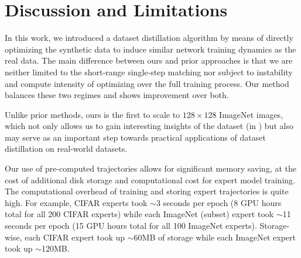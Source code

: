 \section{Discussion and Limitations}
In this work, we introduced a dataset distillation algorithm by means of directly optimizing the synthetic data to induce similar network training dynamics as the real data.  The main difference between ours and prior approaches is that we are neither limited to the short-range single-step matching nor subject to instability and compute intensity of optimizing over the full training process. Our method balances these two regimes and shows improvement over both. 

Unlike prior methods, ours is the first to scale to $128\times 128$ ImageNet images, which not only allows us to gain interesting insights of the dataset (\eg in ) but also may serve as an important step towards practical applications of dataset distillation on real-world datasets. 

 Our use of pre-computed trajectories allows for significant memory saving, at the cost of additional disk storage and computational cost for expert model training. The computational overhead of training and storing expert trajectories is
quite high. For example, CIFAR experts took $\sim$3 seconds per epoch (8 GPU hours total for all 200 CIFAR experts) while each ImageNet (subset) expert took $\sim$11 seconds per epoch (15 GPU hours total for all 100 ImageNet experts). Storage-wise, each CIFAR expert took up $\sim$60MB of storage while each ImageNet expert took up $\sim$120MB.